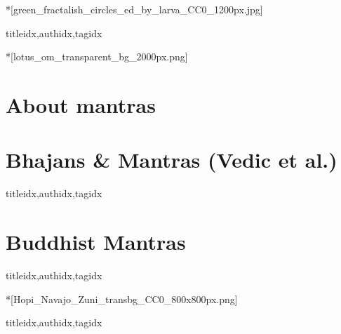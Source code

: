 
  \setcounter{chapter}{2}

  *[green_fractalish_circles_ed_by_larva_CC0_1200px.jpg]
    \begin{songs}{titleidx,authidx,tagidx}
      
    \end{songs}

  *[lotus_om_transparent_bg_2000px.png]
    \section{About mantras}
      
    \clearpage\scleardpage
    \section{Bhajans \& Mantras (Vedic et al.)}
      \begin{songs}{titleidx,authidx,tagidx}
        
      \end{songs}
    \scleardpage
    \section{Buddhist Mantras}
      \begin{songs}{titleidx,authidx,tagidx}
        
      \end{songs}

  *[Hopi_Navajo_Zuni_transbg_CC0_800x800px.png]
    \begin{songs}{titleidx,authidx,tagidx}
      
    \end{songs}

